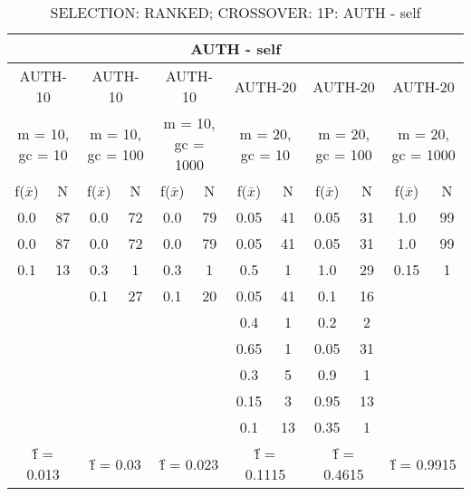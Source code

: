 \begin{table}[H]
	\centering
	\caption{SELECTION: RANKED; CROSSOVER: 1P: AUTH - self}
	\begin{adjustbox}{width=1\textwidth}
		\begin{tabular}{ |c|c||c|c||c|c||c|c||c|c||c|c| }
			\hline
			\multicolumn{12}{|c|}{AUTH - self} \\
			\hline
			\multicolumn{2}{|c||}{AUTH-10} & \multicolumn{2}{c||}{AUTH-10} & \multicolumn{2}{c||}{AUTH-10} & \multicolumn{2}{c||}{AUTH-20} & \multicolumn{2}{c||}{AUTH-20} & \multicolumn{2}{c|}{AUTH-20}\\
			\hline
			\multicolumn{2}{|c||}{m = 10, gc = 10} & \multicolumn{2}{c||}{m = 10, gc = 100} & \multicolumn{2}{c||}{m = 10, gc = 1000} & \multicolumn{2}{c||}{m = 20, gc = 10} & \multicolumn{2}{c||}{m = 20, gc = 100} & \multicolumn{2}{c|}{m = 20, gc = 1000}\\
			\hline
			f($\bar{x}$) & N & f($\bar{x}$) & N & f($\bar{x}$) & N & f($\bar{x}$) & N & f($\bar{x}$) & N & f($\bar{x}$) & N\\
			\hline
			\hline
			0.0 & 87 & 0.0 & 72 & 0.0 & 79 & 0.05 & 41 & 0.05 & 31 & 1.0 & 99\\
			\hline
			0.0 & 87 & 0.0 & 72 & 0.0 & 79 & 0.05 & 41 & 0.05 & 31 & 1.0 & 99\\
			0.1 & 13 & 0.3 & 1 & 0.3 & 1 & 0.5 & 1 & 1.0 & 29 & 0.15 & 1\\
			&   & 0.1 & 27 & 0.1 & 20 & 0.05 & 41 & 0.1 & 16 &   &  \\
			&   &   &   &   &   & 0.4 & 1 & 0.2 & 2 &   &  \\
			&   &   &   &   &   & 0.65 & 1 & 0.05 & 31 &   &  \\
			&   &   &   &   &   & 0.3 & 5 & 0.9 & 1 &   &  \\
			&   &   &   &   &   & 0.15 & 3 & 0.95 & 13 &   &  \\
			&   &   &   &   &   & 0.1 & 13 & 0.35 & 1 &   &  \\
			\hline
			\multicolumn{2}{|c||}{\^{f} = 0.013} & \multicolumn{2}{c||}{\^{f} = 0.03} & \multicolumn{2}{c||}{\^{f} = 0.023} & \multicolumn{2}{c||}{\^{f} = 0.1115} & \multicolumn{2}{c||}{\^{f} = 0.4615} & \multicolumn{2}{c|}{\^{f} = 0.9915}\\
			\hline
		\end{tabular}
	\end{adjustbox}
\end{table}
